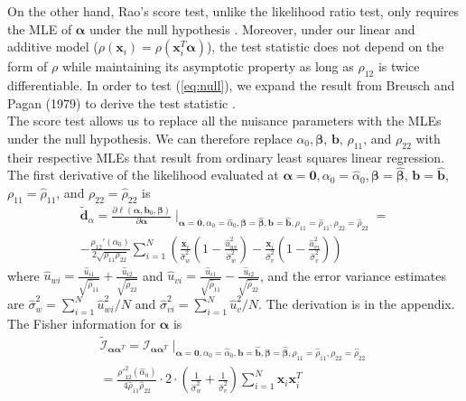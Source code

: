 \documentclass[aoas,preprint]{imsart}
\numberwithin{equation}{section}
\theoremstyle{plain}
\begin{document}
On the other hand, Rao's score test, unlike the likelihood ratio test, only requires the MLE of $\bm{\alpha}$ under the null hypothesis \cite{rao1973linear}. Moreover, under our linear and additive model ($\rho(\bm{x}_i) = \rho(\bm{x}_i^T\bm{\alpha})$), the test statistic does not depend on the form of $\rho$ while maintaining its asymptotic property as long as $\rho_{12}$ is twice differentiable. In order to test (\ref{eq:null}), we expand the result from Breusch and Pagan (1979) to derive the test statistic \cite{breusch1979simple}.\\ 

The score test allows us to replace all the nuisance parameters with the MLEs under the null hypothesis. We can therefore replace $\alpha_0, \bm{\beta}$, $\bm{b}$, $\rho_{11}$, and $\rho_{22}$ with their respective MLEs that result from ordinary least squares linear regression. The first derivative of the likelihood evaluated at $\bm{\alpha}=\bm{0}, \alpha_0 = \hat{\alpha}_0, \bm{\beta} = \bm{\hat{\beta}}$, $\bm{b} = \bm{\hat{b}}$, $\rho_{11} = \hat{\rho}_{11}$, and $\rho_{22} = \hat{\rho}_{22}$ is
\begin{equation}
\begin{multlined}
\bm{\tilde{d}}_{\alpha} = \frac{\partial \ell(\bm{\alpha}, \bm{b}_0, \bm{\beta})} {\partial \bm{\alpha}}\mid_{\bm{\alpha}=\bm{0}, \alpha_0 = \hat{\alpha}_0, \bm{\beta} = \bm{\hat{\beta}}, \bm{b} = \bm{\hat{b}}, \rho_{11} = \hat{\rho}_{11}, \rho_{22} = \hat{\rho}_{22}} =\\
-\frac{\rho_{12}'(\alpha_0)}{2\sqrt{\rho_{11}\rho_{22}}} \sum_{i=1}^{N} \left(
    \frac{\bm{x}_i}{\hat{\sigma}_{w}^2} 
    \left( 1-\frac{\hat{u}_{wi}^2}{\hat{\sigma}_{w}^2}\right) - 
    \frac{\bm{x}_i}{\hat{\sigma}_{v}^2} 
    \left( 1-\frac{\hat{u}_{vi}^2}{\hat{\sigma}_{v}^2}\right) 
    \right)
\end{multlined}
\label{first_derivative}
\end{equation}
where $\hat{u}_{wi} = \frac{\hat{u}_{i1}}{\sqrt{\hat{\rho}_{11}}} +  \frac{\hat{u}_{i2}}{\sqrt{\hat{\rho}_{22}}}$ and $\hat{u}_{vi} = \frac{\hat{u}_{i1}}{\sqrt{\hat{\rho}_{11}}} -  \frac{\hat{u}_{i2}}{\sqrt{\hat{\rho}_{22}}}$, and the error variance estimates are $\hat{\sigma}_w^2 = \sum_{i=1}^{N} \hat{u}_{wi}^2/N$ and $\hat{\sigma}_{vi}^2 = \sum_{i=1}^{N}\hat{u}_v^2/N$. The derivation is in the appendix. The Fisher information for $\bm{\alpha}$ is
\begin{equation}
\begin{multlined}
        \tilde{\mathcal{I}}_{\bm{\alpha}\bm{\alpha}^T} = \mathcal{I}_{\bm{\alpha}\bm{\alpha}^T}\mid_{
        \bm{\alpha}=\bm{0}, 
        \alpha_0 = \hat{\alpha}_0,
        \bm{b} = \bm{\hat{b}},
        \bm{\beta} = \bm{\hat{\beta}},
        {\rho}_{11} = \hat{\rho}_{11},
        {\rho}_{22} = \hat{\rho}_{22}}\\
        = \frac{{\rho'}^2_{12}(\hat{\alpha}_0)}{4\hat{\rho}_{11}\hat{\rho}_{22}}\cdot 2 \cdot \left(\frac{1}{\hat{\sigma}_{w}^2} +  \frac{1}{\hat{\sigma}_{v}^2}\right) \sum_{i=1}^{N} \bm{x}_i \bm{x}_i^T
    \end{multlined}
\end{equation}
\end{document}

